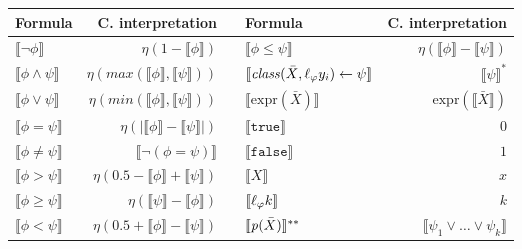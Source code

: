 
\begin{table}
    \centering
    \begin{tabular}{l|r||cl|r}
        \textbf{Formula} & \textbf{C. interpretation} & & \textbf{Formula} & \textbf{C. interpretation}
        \\
        \hline\hline
        $\llbracket\neg \phi\rrbracket$ & $\eta(1 - \llbracket\phi\rrbracket)$ & & $\llbracket\phi \le \psi\rrbracket$  & $\eta(\llbracket\phi\rrbracket - \llbracket\psi\rrbracket)$
        \\
        $\llbracket\phi  \wedge \psi\rrbracket$ &  $\eta(max(\llbracket\phi\rrbracket, \llbracket\psi\rrbracket))$ & & $\llbracket \mathit{class}(\bar{X}, \ell_{\varphi}{y}_i) \leftarrow \psi \rrbracket$ & $\llbracket \psi \rrbracket^{*}$
        \\
        $\llbracket\phi  \vee \psi\rrbracket$ & $\eta(min(\llbracket\phi\rrbracket, \llbracket\psi\rrbracket))$ & & $\llbracket \text{expr}(\bar{X}) \rrbracket$ & $\text{expr}(\llbracket\bar{X}\rrbracket)$
        \\
        $\llbracket\phi = \psi\rrbracket$ & $\eta(|\llbracket\phi\rrbracket-\llbracket\psi\rrbracket|)$ & & $\llbracket \mathtt{true} \rrbracket$ & $0$
        \\
        $\llbracket\phi \ne \psi\rrbracket$ & $\llbracket \neg ( \phi = \psi )\rrbracket$ & & $\llbracket \mathtt{false} \rrbracket$ & $1$
        \\
        $\llbracket\phi > \psi\rrbracket$  & $\eta(0.5 - \llbracket\phi\rrbracket + \llbracket\psi\rrbracket) $ & & $\llbracket X \rrbracket$ & $x$
        \\
        $\llbracket\phi \ge \psi\rrbracket$ & $\eta(\llbracket\psi\rrbracket - \llbracket\phi\rrbracket)$ & & $\llbracket \ell_{\varphi}{k} \rrbracket$ & $k$
        \\
        $\llbracket\phi < \psi\rrbracket$  &  $\eta(0.5 + \llbracket\phi\rrbracket - \llbracket\psi\rrbracket)$ & & $\llbracket \mathit{p}(\bar{X}) \rrbracket^{**}$ & $\llbracket \psi_1 \vee \ldots \vee \psi_k \rrbracket$
        

\end{tabular}
\end{table}
